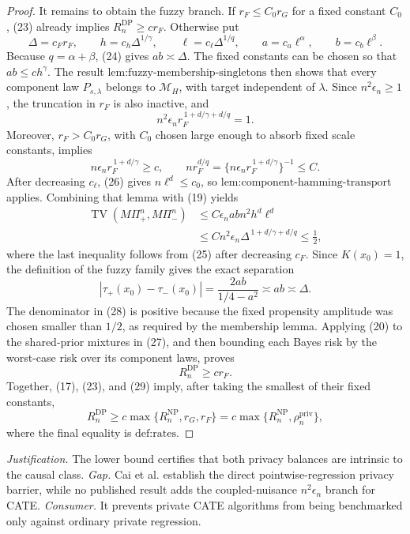 \documentclass{article}
\begin{document}
\begin{proof}
It remains to obtain the fuzzy branch.  If \(r_F\le C_0r_G\) for a fixed constant \(C_0\), (23) already implies \(R_n^{\mathrm{DP}}\ge c r_F\).  Otherwise put
\[
 \Delta=c_Fr_F,\qquad
 h=c_h\Delta^{1/\gamma},\qquad
 \ell=c_\ell\Delta^{1/q},\qquad
 a=c_a\ell^\alpha,\qquad b=c_b\ell^\beta.                  \tag{24}
\]
Because \(q=\alpha+\beta\), (24) gives \(ab\asymp\Delta\).  The fixed constants can be chosen so that \(ab\le c h^\gamma\).  The result \(\text{lem:fuzzy-membership-singletons}\) then shows that every component law \(P_{s,\lambda}\) belongs to \(\mathcal M_H\), with target independent of \(\lambda\).  Since \(n^2\epsilon_n\ge1\), the truncation in \(r_F\) is also inactive, and
\[
 n^2\epsilon_n r_F^{\,1+d/\gamma+d/q}=1.                                        \tag{25}
\]
Moreover, \(r_F>C_0r_G\), with \(C_0\) chosen large enough to absorb fixed scale constants, implies
\[
 n\epsilon_n r_F^{\,1+d/\gamma}\ge c,
 \qquad
 n r_F^{d/q}=\{n\epsilon_n r_F^{\,1+d/\gamma}\}^{-1}\le C.                  \tag{26}
\]
After decreasing \(c_\ell\), (26) gives \(n\ell^d\le c_0\), so \(\text{lem:component-hamming-transport}\) applies.  Combining that lemma with (19) yields
\[
 \begin{aligned}
 \operatorname{TV}(M\Pi_+^n,M\Pi_-^n)
 &\le C\epsilon_nabn^2h^d\ell^d\\
 &\le Cn^2\epsilon_n\Delta^{\,1+d/\gamma+d/q}
 \le\tfrac12,                                                                  \tag{27}
 \end{aligned}
\]
where the last inequality follows from (25) after decreasing \(c_F\).  Since \(K(x_0)=1\), the definition of the fuzzy family gives the exact separation
\[
 \left|\tau_+(x_0)-\tau_-(x_0)\right|
 =\frac{2ab}{1/4-a^2}\asymp ab\asymp\Delta.                                  \tag{28}
\]
The denominator in (28) is positive because the fixed propensity amplitude was chosen smaller than \(1/2\), as required by the membership lemma.  Applying (20) to the shared-prior mixtures in (27), and then bounding each Bayes risk by the worst-case risk over its component laws, proves
\[
 R_n^{\mathrm{DP}}\ge c r_F.                                                     \tag{29}
\]
Together, (17), (23), and (29) imply, after taking the smallest of their fixed constants,
\[
 R_n^{\mathrm{DP}}
 \ge c\max\{R_n^{\mathrm{NP}},r_G,r_F\}
 =c\max\{R_n^{\mathrm{NP}},\rho_n^{\mathrm{priv}}\},
\]
where the final equality is \(\text{def:rates}\).
\end{proof}
\par\smallskip\noindent \textit{Justification.} The lower bound certifies that both privacy balances are intrinsic to the causal class. \textit{Gap.} Cai et al. establish the direct pointwise-regression privacy barrier, while no published result adds the coupled-nuisance \(n^2\epsilon_n\) branch for CATE. \textit{Consumer.} It prevents private CATE algorithms from being benchmarked only against ordinary private regression.
\end{document}
